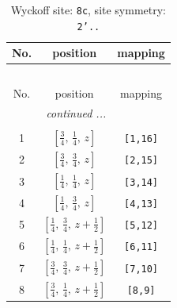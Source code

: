 \documentclass[fleqn,8pt]{jsarticle}
\begin{document}
\renewcommand{\arraystretch}{1.2}
\begin{longtable}{ccc}
\caption{Wyckoff site: {\tt 8c}, site symmetry: {\tt 2'..}}
 \\
 \hline \hline
No. & position & mapping \\ \hline \endfirsthead

\multicolumn{2}{l}{\tablename\ \thetable{}} \\
 \hline \hline
No. & position & mapping \\ \hline \endhead

 \hline \hline
\multicolumn{2}{r}{\footnotesize\it continued ...} \\ \endfoot

 \hline \hline
\multicolumn{2}{r}{} \\ \endlastfoot

1 & $\left[ \frac{3}{4},\, \frac{1}{4},\, z \right]$ & {\tt [1,16]} \\ \hline
2 & $\left[ \frac{3}{4},\, \frac{3}{4},\, z \right]$ & {\tt [2,15]} \\ \hline
3 & $\left[ \frac{1}{4},\, \frac{1}{4},\, z \right]$ & {\tt [3,14]} \\ \hline
4 & $\left[ \frac{1}{4},\, \frac{3}{4},\, z \right]$ & {\tt [4,13]} \\ \hline
5 & $\left[ \frac{1}{4},\, \frac{3}{4},\, z + \frac{1}{2} \right]$ & {\tt [5,12]} \\ \hline
6 & $\left[ \frac{1}{4},\, \frac{1}{4},\, z + \frac{1}{2} \right]$ & {\tt [6,11]} \\ \hline
7 & $\left[ \frac{3}{4},\, \frac{3}{4},\, z + \frac{1}{2} \right]$ & {\tt [7,10]} \\ \hline
8 & $\left[ \frac{3}{4},\, \frac{1}{4},\, z + \frac{1}{2} \right]$ & {\tt [8,9]} \\
\end{longtable}
\renewcommand{\arraystretch}{1.2}
\end{document}
